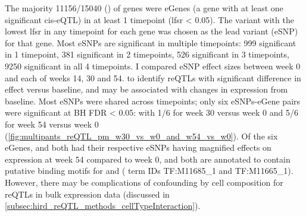 \begin{outline}
The majority 11156/15040 () of genes were eGenes (a gene with at least one significant cis-eQTL) in at least 1 timepoint (lfsr < 0.05).
The variant with the lowest lfsr in any timepoint for each gene was 
chosen as the lead variant (eSNP) for that gene.
Most eSNPs are significant in multiple timepoints: 999 significant in 1 timepoint, 381 significant in 2 timepoints, 526 significant in 3 timepoints, 9250 significant in all 4 timepoints.
I compared eSNP effect sizes between week 0 and each of weeks 14, 30 and 54.
to identify \glspl{reQTL} with significant difference in effect versus baseline,
and may be associated with changes in expression from baseline.
Most eSNPs were shared across timepoints;
only six eSNPs-eGene pairs were significant at BH FDR < 0.05:
with 1/6 for week 30 versus week 0 and 5/6 for week 54 versus week 0 (\autoref{fig:multipants_reQTL_pm_w30_vs_w0_and_w54_vs_w0}).
Of the six eGenes,  and  both had their respective eSNPs having magnified effects on expression at week 54 compared to week 0,
and both are annotated to contain putative binding motifs for  and  ( term IDs TF:M11685\_1 and TF:M11665\_1).
However, there may be complications of confounding  by cell composition for reQTLs in bulk expression data (discussed in \autoref{subsec:hird_reQTL_methods_cellTypeInteraction}).



\end{outline}
